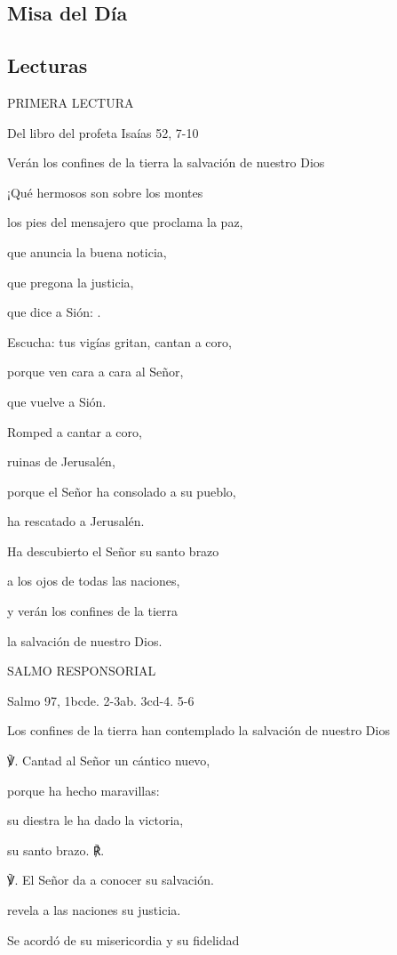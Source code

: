 \begin{body}
\begin{body}
\chapter{Misa del Día}

\section{Lecturas}

PRIMERA LECTURA

Del libro del profeta Isaías 52, 7-10

Verán los confines de la tierra la salvación de nuestro Dios

¡Qué hermosos son sobre los montes

los pies del mensajero que proclama la paz,

que anuncia la buena noticia,

que pregona la justicia,

que dice a Sión: .

Escucha: tus vigías gritan, cantan a coro,

porque ven cara a cara al Señor,

que vuelve a Sión.

Romped a cantar a coro,

ruinas de Jerusalén,

porque el Señor ha consolado a su pueblo,

ha rescatado a Jerusalén.

Ha descubierto el Señor su santo brazo

a los ojos de todas las naciones,

y verán los confines de la tierra

la salvación de nuestro Dios.

SALMO RESPONSORIAL

Salmo 97, 1bcde. 2-3ab. 3cd-4. 5-6

Los confines de la tierra han contemplado la salvación de nuestro Dios

℣. Cantad al Señor un cántico nuevo,

porque ha hecho maravillas:

su diestra le ha dado la victoria,

su santo brazo. ℟.

℣. El Señor da a conocer su salvación.

revela a las naciones su justicia.

Se acordó de su misericordia y su fidelidad


\end{body}
\end{body}
